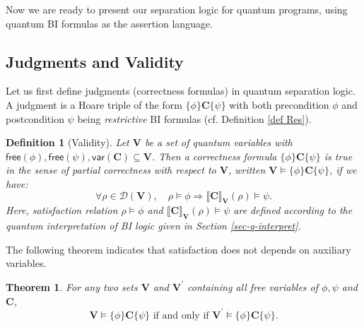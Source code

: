 \documentclass[conference,compsoc, 10pt]{IEEEtran}
\newcommand{\jh}[1]{\textit{\color{red}[JH] : #1}}
\newcommand{\lz}[1]{\textit{\color{blue}[LZ] : #1}}
\newtheorem{theorem}{Theorem}[section]
\newtheorem{definition}{Definition}[section]
\newtheorem{proposition}{Proposition}[section]
\newcommand {\cD } {{\mathcal{D}}}
\newcommand {\free }[1] {{\mathsf{free}\left(#1\right)}}
\newcommand {\vars } {\mathbf{V}}
\newcommand {\var } {\mathsf{var}}
\newcommand {\prog } {{\mathbf{C}}}
\newcommand {\sem}[1] {\llbracket#1\rrbracket}
\begin{document}
  Now we are ready to present our separation logic for quantum programs, using
  quantum BI formulas as the assertion language. 	
	
	\subsection{Judgments and Validity}
	
  Let us first define judgments (correctness formulas) in quantum separation
  logic. A judgment is a Hoare triple of the form $\{\phi\}\prog\{\psi\}$ with
  both precondition $\phi$ and postcondition $\psi$ being \emph{restrictive} BI
  formulas (cf. Definition \ref{def Res}).
	
	\begin{definition}[Validity] Let $\vars$ be a set of quantum variables with $\free{\phi},\free{\psi},\var(\prog)\subseteq\vars$. Then a correctness formula $\{\phi\}\prog\{\psi\}$ is true in the sense of partial correctness with respect to $\vars$, written 
		$\vars \models\{\phi\}\prog\{\psi\}$, 
		if we have:
		$$\forall \rho\in\cD(\vars),\quad \rho\models\phi\Rightarrow\sem{\prog}_{\vars}(\rho)\models\psi.$$ Here, satisfaction relation $\rho\models\phi$ and $\sem{\prog}_{\vars}(\rho)\models\psi$ are defined according to the quantum interpretation of BI logic given in Section \ref{sec-q-interpret}.
	\end{definition}
	
	
	The following theorem indicates that satisfaction does not depends on auxiliary variables.
	\begin{theorem}
		\label{thm eq glb var set}
		For any two sets $\vars$ and $\vars^\prime$ containing all free variables of $\phi, \psi$ and $\prog$,
		$$\vars\models\{\phi\}\prog\{\psi\} \text{\ if\ and\ only\ if\ }\vars^\prime\models\{\phi\}\prog\{\psi\}.$$
	\end{theorem}
	
\end{document}

